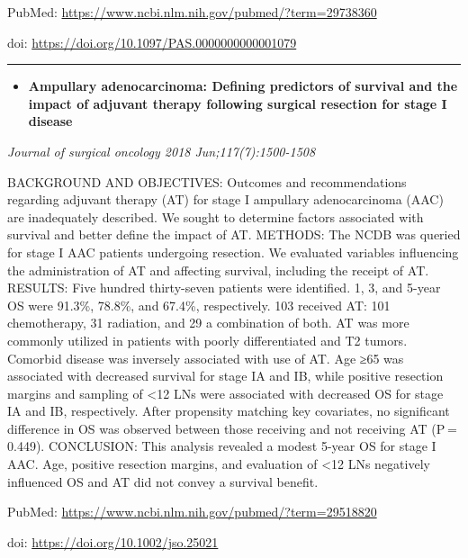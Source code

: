 \documentclass[]{article}
\providecommand{\tightlist}{%
  \setlength{\itemsep}{0pt}\setlength{\parskip}{0pt}}
\begin{document}
PubMed: \url{https://www.ncbi.nlm.nih.gov/pubmed/?term=29738360}

doi: \url{https://doi.org/10.1097/PAS.0000000000001079}

{}

{}

\begin{center}\rule{0.5\linewidth}{\linethickness}\end{center}

\begin{itemize}
\tightlist
\item
  \textbf{Ampullary adenocarcinoma: Defining predictors of survival and
  the impact of adjuvant therapy following surgical resection for stage
  I disease}
\end{itemize}

\emph{Journal of surgical oncology 2018 Jun;117(7):1500-1508}

BACKGROUND AND OBJECTIVES: Outcomes and recommendations regarding
adjuvant therapy (AT) for stage I ampullary adenocarcinoma (AAC) are
inadequately described. We sought to determine factors associated with
survival and better define the impact of AT. METHODS: The NCDB was
queried for stage I AAC patients undergoing resection. We evaluated
variables influencing the administration of AT and affecting survival,
including the receipt of AT. RESULTS: Five hundred thirty-seven patients
were identified. 1, 3, and 5-year OS were 91.3\%, 78.8\%, and 67.4\%,
respectively. 103 received AT: 101 chemotherapy, 31 radiation, and 29 a
combination of both. AT was more commonly utilized in patients with
poorly differentiated and T2 tumors. Comorbid disease was inversely
associated with use of AT. Age ≥65 was associated with decreased
survival for stage IA and IB, while positive resection margins and
sampling of \textless{}12 LNs were associated with decreased OS for
stage IA and IB, respectively. After propensity matching key covariates,
no significant difference in OS was observed between those receiving and
not receiving AT (P = 0.449). CONCLUSION: This analysis revealed a
modest 5-year OS for stage I AAC. Age, positive resection margins, and
evaluation of \textless{}12 LNs negatively influenced OS and AT did not
convey a survival benefit.

PubMed: \url{https://www.ncbi.nlm.nih.gov/pubmed/?term=29518820}

doi: \url{https://doi.org/10.1002/jso.25021}

{}

{}
\end{document}
